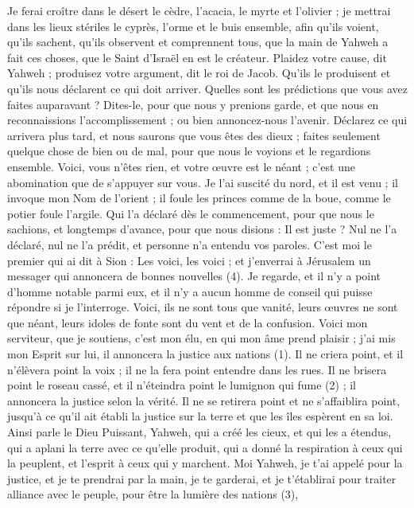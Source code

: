 \begin{multicols}{2}
Je ferai croître dans le désert le cèdre, l’acacia, le myrte et l'olivier ; je mettrai dans les lieux stériles le cyprès, l'orme et le buis ensemble,
afin qu’ils voient, qu’ils sachent, qu’ils observent et comprennent tous, que la main de Yahweh a fait ces choses, que le Saint d'Israël en est le créateur.
Plaidez votre cause, dit Yahweh ; produisez votre argument, dit le roi de Jacob.
Qu’ils le produisent et qu’ils nous déclarent ce qui doit arriver. Quelles sont les prédictions que vous avez faites auparavant ? Dites-le, pour que nous y prenions garde, et que nous en reconnaissions l’accomplissement ; ou bien annoncez-nous l’avenir.
Déclarez ce qui arrivera plus tard, et nous saurons que vous êtes des dieux ; faites seulement quelque chose de bien ou de mal, pour que nous le voyions et le regardions ensemble.
Voici, vous n’êtes rien, et votre œuvre est le néant ; c’est une abomination que de s’appuyer sur vous.
Je l'ai suscité du nord, et il est venu ; il invoque mon Nom de l’orient ; il foule les princes comme de la boue, comme le potier foule l’argile.
Qui l’a déclaré dès le commencement, pour que nous le sachions, et longtemps d’avance, pour que nous disions : Il est juste ? Nul ne l’a déclaré, nul ne l’a prédit, et personne n’a entendu vos paroles.
C’est moi le premier qui ai dit à Sion : Les voici, les voici ; et j’enverrai à Jérusalem un messager qui annoncera de bonnes nouvelles (4).
Je regarde, et il n'y a point d'homme notable parmi eux, et il n'y a aucun homme de conseil qui puisse répondre si je l’interroge.
Voici, ils ne sont tous que vanité, leurs œuvres ne sont que néant, leurs idoles de fonte sont du vent et de la confusion.
\VerseOne{}Voici mon serviteur, que je soutiens, c'est mon élu, en qui mon âme prend plaisir ; j'ai mis mon Esprit sur lui, il annoncera la justice aux nations (1).
Il ne criera point, et il n’élèvera point la voix ; il ne la fera point entendre dans les rues.
Il ne brisera point le roseau cassé, et il n'éteindra point le lumignon qui fume (2) ; il annoncera la justice selon la vérité.
Il ne se retirera point et ne s’affaiblira point, jusqu’à ce qu’il ait établi la justice sur la terre et que les îles espèrent en sa loi.
Ainsi parle le Dieu Puissant, Yahweh, qui a créé les cieux, et qui les a étendus, qui a aplani la terre avec ce qu'elle produit, qui a donné la respiration à ceux qui la peuplent, et l'esprit à ceux qui y marchent.
Moi Yahweh, je t'ai appelé pour la justice, et je te prendrai par la main, je te garderai, et je t’établirai pour traiter alliance avec le peuple, pour être la lumière des nations (3),

\end{multicols}
